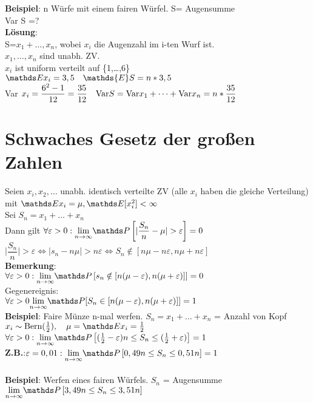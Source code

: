\textbf{Beispiel}: n Würfe mit einem fairen Würfel. S= Augensumme\\
Var S =?\smallskip\\
\textbf{Lösung}:\\
S=$x_1+\dots,x_n$, wobei $x_i$ die Augenzahl im i-ten Wurf ist.\\ $x_1,\dots,x_n$ sind unabh. ZV.\smallskip\\
$x_i$ ist uniform verteilt auf \{1,\dots,6\}\smallskip\\
$\E x_i = 3,5 \quad \mathds{E}S=n*3,5$\smallskip\\
Var $x_i = \dfrac{6^2-1}{12}=\dfrac{35}{12} \quad \text{Var} S = \text{Var} x_1 + \dots + \text{Var} x_n = n*\dfrac{35}{12}$
\section{Schwaches Gesetz der großen Zahlen}
Seien $x_i,x_2,\dots$ unabh. identisch verteilte ZV (alle $x_i$ haben die gleiche Verteilung) mit $\E x_i = \mu, \E[x_i^2] < \infty$\medskip\\
Sei $S_n = x_1 + \dots + x_n$\smallskip\\
Dann gilt $\forall \varepsilon > 0:\limntoinf \PP \left[\vert \dfrac{S_n}{n}-\mu \vert > \varepsilon \right] = 0$\medskip\\
$\vert \dfrac{S_n}{n}\vert > \varepsilon \Leftrightarrow \vert s_n - n\mu \vert > n \varepsilon \Leftrightarrow S_n \notin [n\mu -n\varepsilon,n\mu + n\varepsilon]$\medskip\\
\textbf{Bemerkung}:\\
$\forall \varepsilon > 0: \limntoinf \PP \left[s_n \notin [n(\mu-\varepsilon),n(\mu + \varepsilon)]\right] = 0$\medskip\\
Gegenereignis:\\
$\forall \varepsilon >0 \limntoinf \PP[S_n \in [n(\mu - \varepsilon),n(\mu + \varepsilon)]] = 1$\medskip\\
\textbf{Beispiel}: Faire Münze n-mal werfen. $S_n = x_1 + \dots + x_n$ = Anzahl von Kopf\smallskip\\
$x_i \sim \text{Bern}(\frac{1}{2}), \quad\mu = \E x_i = \frac{1}{2}$\smallskip\\
$\forall \varepsilon > 0 : \limntoinf \PP \left[(\frac{1}{2}-\varepsilon)n \leq S_n \leq (\frac{1}{2}+\varepsilon)\right] = 1$\medskip\\
\textbf{Z.B.}:$ \varepsilon = 0,01: \limntoinf \PP \left[0,49n\leq S_n\leq 0,51n\right]=1$\smallskip\\
\smallskip\\
\textbf{Beispiel}: Werfen eines fairen Würfels. $S_n$ = Augensumme\smallskip\\
$\limntoinf\PP\left[3,49 n \leq S_n \leq 3,51n\right]$\medskip\\
